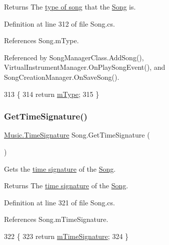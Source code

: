\begin{DoxyReturn}{Returns}
The \hyperlink{group___song_enums_gae681a1f001333e39fc1cb4fea97bfe1b}{type of song} that the \hyperlink{class_song}{Song} is. 
\end{DoxyReturn}


Definition at line 312 of file Song.\+cs.



References Song.\+m\+Type.



Referenced by Song\+Manager\+Class.\+Add\+Song(), Virtual\+Instrument\+Manager.\+On\+Play\+Song\+Event(), and Song\+Creation\+Manager.\+On\+Save\+Song().


\begin{DoxyCode}
313     \{
314         \textcolor{keywordflow}{return} \hyperlink{group___song_priv_var_gaf3b9d0f461522324f897b746311b43c5}{mType};
315     \}
\end{DoxyCode}
\mbox{\label{group___song_pub_func_ga26315bb6d554d46e2eba2ac03ee70cc1}} 
\subsubsection{\texorpdfstring{Get\+Time\+Signature()}{GetTimeSignature()}}
{\footnotesize\ttfamily \hyperlink{group___music_structs_struct_music_1_1_time_signature}{Music.\+Time\+Signature} Song.\+Get\+Time\+Signature (\begin{DoxyParamCaption}{ }\end{DoxyParamCaption})}



Gets the \hyperlink{group___music_structs_struct_music_1_1_time_signature}{time signature} of the \hyperlink{class_song}{Song}. 

\begin{DoxyReturn}{Returns}
The \hyperlink{group___music_structs_struct_music_1_1_time_signature}{time signature} of the \hyperlink{class_song}{Song}. 
\end{DoxyReturn}


Definition at line 321 of file Song.\+cs.



References Song.\+m\+Time\+Signature.


\begin{DoxyCode}
322     \{
323         \textcolor{keywordflow}{return} \hyperlink{group___song_priv_var_ga2b2dcc0e83e49f7303b6a1371877b25e}{mTimeSignature};
324     \}
\end{DoxyCode}
\mbox{\label{group___song_pub_func_ga856634e047b8c35160958c3aa53d6b28}} 
